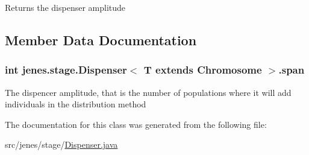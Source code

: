 \begin{DoxyReturn}{Returns}
the dispenser amplitude 
\end{DoxyReturn}


\subsection{Member Data Documentation}
\hypertarget{classjenes_1_1stage_1_1_dispenser_3_01_t_01extends_01_chromosome_01_4_a8f9bc0997e0536729db0c55bc9e240a5}{
\subsubsection[{span}]{\setlength{\rightskip}{0pt plus 5cm}int jenes.\-stage.\-Dispenser$<$ T extends Chromosome $>$.span\hspace{0.3cm}{\ttfamily [protected]}}}\label{classjenes_1_1stage_1_1_dispenser_3_01_t_01extends_01_chromosome_01_4_a8f9bc0997e0536729db0c55bc9e240a5}
The dispencer amplitude, that is the number of populations where it will add individuals in the distribution method 

The documentation for this class was generated from the following file\-:\begin{DoxyCompactItemize}
\item 
src/jenes/stage/\hyperlink{_dispenser_8java}{Dispenser.\-java}\end{DoxyCompactItemize}

